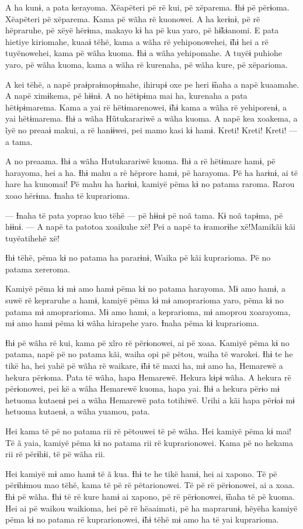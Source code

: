 A ha kunɨ, a pata kerayoma. Xëapëteri pë rë kui, pë xëparema. Ɨhɨ pë
përɨoma. Xëapëteri pë xëparema. Kama pë wãha rë kuonowei. A ha kerɨnɨ,
pë rë hëpraruhe, pë xëyë hërɨma, makayo kɨ ha pë kua yaro, pë hɨ̃kɨanomi.
E pata hietiye kiriomahe, kuaaɨ tëhë, kama a wãha rë yehiponowehei, ɨ̃hɨ
hei a rë tuyënowehei, kama pë wãha kuoma. Ɨhɨ a wãha yehipomahe. A tuyëɨ
puhiohe yaro, pë wãha kuoma, kama a wãha rë kurenaha, pë wãha kure, pë
xëparioma.

A kei tëhë, a napë praɨpraɨmopɨmahe, ihirupɨ oxe pe heri ɨ̃naha a napë
kuaamahe. A napë ximɨkema, pë hɨɨnɨ. A no hëtɨpɨma mai ha, kurenaha a
pata hëtɨpɨmarema. Kama a yai rë hëtɨmarenowei, ɨ̃hɨ kama a wãha rë
yehiporenɨ, a yai hëtɨmarema. Ɨhɨ a wãha Hũtukarariwë a wãha kuoma. A napë kea xoakema, a ĩyë no preaaɨ makui, a rë hanɨɨwei, pei mamo kasi kɨ
hamɨ. Kreti! Kreti! Kreti! --- a tama.

A no preaama. Ɨhɨ a wãha Hutukarariwë kuoma. Ɨhɨ a rë hëtɨmare hamɨ, pë
harayoma, hei a ha. Ɨhɨ mahu a rë hëprore hamɨ, pë harayoma. Pë ha
harɨnɨ, ai të hare ha kunomai! Pë mahu ha harɨnɨ, kamiyë pëma kɨ no
patama raroma. Rarou xoao hërɨma. Ɨnaha të kuprarioma. 

--- Ɨnaha të pata yoprao kuo tëhë --- pë hɨɨnɨ pë noã tama. Kɨ noã
tapɨma, pë hɨɨnɨ. --- A napë ta patotoa xoaikuhe xë! Pei a napë ta
ɨramorɨhe xë!Mamikãi kãi tuyëatihehë xë!

Ɨhɨ tëhë, pëma kɨ no patama ha pararɨnɨ, Waika pë kãi kuprarioma. Pë no
patama xereroma. 

Kamiyë pëma kɨ mɨ amo hamɨ pëma kɨ no patama harayoma. Mɨ amo hamɨ, a
suwë rë kepraruhe a hamɨ, kamiyë pëma kɨ mɨ amoprarioma yaro, pëma kɨ no
patama mɨ amoprarioma. Mɨ amo hamɨ, a keprarioma, mɨ amoprou xoarayoma,
mɨ amo hamɨ pëma kɨ wãha hirapehe yaro. Ɨnaha pëma kɨ kuprarioma. 

Ɨhɨ pë wãha rë kui, kama pë xĩro rë përɨonowei, ai pë xoaa. Kamiyë pëma
kɨ no patama, napë pë no patama kãi, waiha opi pë pëtou, waiha të
warokei. Ɨhɨ te he tikë ha, hei yahë pë wãha rë waikare, ɨ̃hɨ të maxi ha,
mɨ amo ha, Hemarewë a hekura përɨoma. Pata të wãha, hapa Hemarewë.
Hekura kɨpɨ wãha. A hekura rë përɨonowei, pei kë a wãha Hemarewë kuoma,
hapa yai. Ɨhɨ a hekura përɨo mɨ hetuoma kutaenɨ pei a wãha Hemarewë pata
totihiwë. Urihi a kãi hapa përɨaɨ mɨ hetuoma kutaenɨ, a wãha yuamou,
pata. 

Hei kama të pë no patama rii rë pëtouwei të pë wãha. Hei kamiyë pëma kɨ
mai! Të ã yaia, kamiyë pëma kɨ no patama rii rë kuprarionowei. Kama pë
no hekama rii rë përɨhɨi, të pë wãha rii. 

Hei kamiyë mɨ amo hamɨ të ã kua. Ɨhɨ te he tikë hamɨ, hei ai xapono. Të
pë përɨhɨmou mao tëhë, kama të pë rë pëtarionowei. Të pë rë përɨonowei,
ai a xoaa. Ɨhɨ pë wãha. Ɨhɨ të rë kure hamɨ ai xapono, pë rë përɨonowei,
ɨ̃naha të pë kuoma. Hei ai pë waikou waikioma, hei pë rë hëaaimati, pë ha
maprarunɨ, hëyëha kamiyë pëma kɨ no patama rë kuprarionowei, ɨ̃hɨ tëhë mɨ
amo ha të yai kuprarioma. 

 
